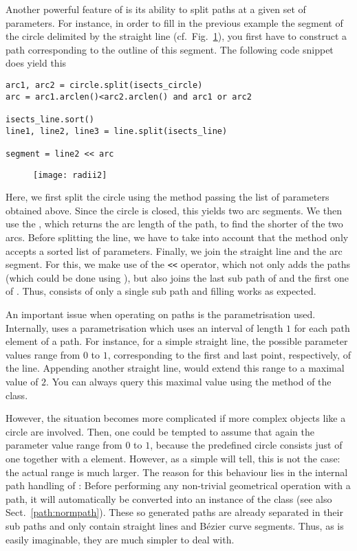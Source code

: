 Another powerful feature of \PyX{} is its ability to split paths at a
given set of parameters. For instance, in order to fill in the
previous example the segment of the circle delimited by the straight
line (cf.\ Fig.~\ref{fig:radii2}), you first have to construct a path
corresponding to the outline of this segment. The following code
snippet does yield this 
\begin{verbatim}
arc1, arc2 = circle.split(isects_circle)
arc = arc1.arclen()<arc2.arclen() and arc1 or arc2

isects_line.sort()
line1, line2, line3 = line.split(isects_line)

segment = line2 << arc
\end{verbatim}
\begin{figure}
\centerline{\texttt{[image: radii2]}}
\label{fig:radii2}
\end{figure}
Here, we first split the circle using the  method passing
the list of parameters obtained above. Since the circle is closed,
this yields two arc segments. We then use the , which
returns the arc length of the path, to find the shorter of the two
arcs. Before splitting the line, we have to take into account that
the  method only accepts a sorted list of parameters.
Finally, we join the straight line and the arc segment. For
this, we make use of the \verb|<<| operator, which not only adds
the paths (which could be done using ), but also
joins the last sub path of  and the first one of
. Thus,  consists of only a single sub path
and filling works as expected.

An important issue when operating on paths is the parametrisation
used. Internally, \PyX{} uses a parametrisation which uses an interval
of length $1$ for each path element of a path. For instance, for a
simple straight line, the possible parameter values range from $0$ to
$1$, corresponding to the first and last point, respectively, of the
line. Appending another straight line, would extend this range to a
maximal value of $2$. You can always query this maximal value using
the  method of the  class.  

However, the situation becomes more complicated if more complex
objects like a circle are involved. Then, one could be tempted to
assume that again the parameter value range from $0$ to $1$, because
the predefined circle consists just of one  together with a
 element. However, as a simple  will tell, this is not the case: the actual range is
much larger. The reason for this behaviour lies in the internal path
handling of \PyX: Before performing any non-trivial geometrical
operation with a path, it will automatically be converted into an
instance of the  class (see also
Sect.~\ref{path:normpath}). These so generated paths are already
separated in their sub paths and only contain straight lines and
B\'ezier curve segments. Thus, as is easily imaginable, they are much
simpler to deal with.

